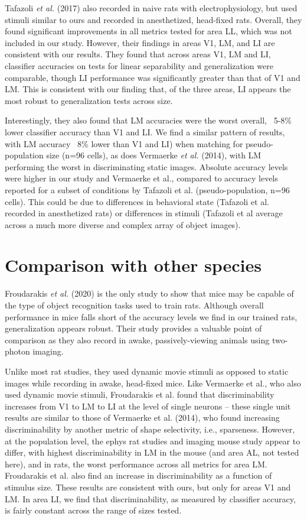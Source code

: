 Tafazoli \textit{et al.} (2017) also recorded in naive rats with electrophysiology, but used stimuli similar to ours and recorded in anesthetized, head-fixed rats. Overall, they found significant improvements in all metrics tested for area LL, which was not included in our study. However, their findings in areas V1, LM, and LI are consistent with our results. They found that across areas V1, LM and LI, classifier accuracies on tests for linear separability and generalization were comparable, though LI performance was significantly greater than that of V1 and LM. This is consistent with our finding that, of the three areas, LI appears the most robust to generalization tests across size.

Interestingly, they also found that LM accuracies were the worst overall, ~5-8\% lower classifier accuracy than V1 and LI. We find a similar pattern of results, with LM accuracy ~8\% lower than V1 and LI) when matching for pseudo-population size (n=96 cells), as does Vermaerke \textit{et al.} (2014), with LM performing the worst in discriminating static images. Absolute accuracy levels were higher in our study and Vermaerke et al., compared to accuracy levels reported for a subset of conditions by Tafazoli et al. (pseudo-population, n=96 cells). This could be due to differences in behavioral state (Tafazoli et al. recorded in anesthetized rats) or differences in stimuli (Tafazoli et al average across a much more diverse and complex array of object images). 

\section{Comparison with other species}
Froudarakis \textit{et al.} (2020) is the only study to show that mice may be capable of the type of object recognition tasks used to train rats. Although overall performance in mice falls short of the accuracy levels we find in our trained rats, generalization appears robust. Their study provides a valuable point of comparison as they also record in awake, passively-viewing animals using two-photon imaging.

Unlike most rat studies, they used dynamic movie stimuli as opposed to static images while recording in awake, head-fixed mice. Like Vermaerke et al., who also used dynamic movie stimuli, Froudarakis et al. found that discriminability increases from V1 to LM to LI at the level of single neurons -- these single unit results are similar to those of Vermaerke et al. (2014), who found increasing discriminability by another metric of shape selectivity, i.e., sparseness. However, at the population level, the ephys rat studies and imaging mouse study appear to differ, with highest discriminability in LM in the mouse (and area AL, not tested here), and in rats, the worst performance across all metrics for area LM. Froudarakis et al. also find an increase in discriminability as a function of stimulus size. These results are consistent with ours, but only for areas V1 and LM. In area LI, we find that discriminability, as measured by classifier accuracy, is fairly constant across the range of sizes tested. 

